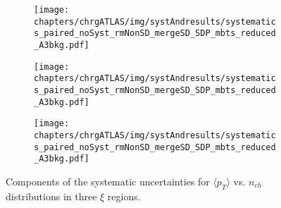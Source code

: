 \begin{figure}[h!]
	\centering
	\begin{subfigure}{.49\textwidth}
		\texttt{[image: chapters/chrgATLAS/img/systAndresults/systematics\_paired\_noSyst\_rmNonSD\_mergeSD\_SDP\_mbts\_reduced\_A3bkg.pdf]}
	\end{subfigure}
	\begin{subfigure}{.49\textwidth}
		\texttt{[image: chapters/chrgATLAS/img/systAndresults/systematics\_paired\_noSyst\_rmNonSD\_mergeSD\_SDP\_mbts\_reduced\_A3bkg.pdf]}
	\end{subfigure}
	\begin{subfigure}{.49\textwidth}
		\texttt{[image: chapters/chrgATLAS/img/systAndresults/systematics\_paired\_noSyst\_rmNonSD\_mergeSD\_SDP\_mbts\_reduced\_A3bkg.pdf]}
	\end{subfigure}
	\begin{minipage}{.49\textwidth}
		\caption{Components of the systematic uncertainties for $\langle p_T \rangle$ vs. $n_{ch}$ distributions in three $\xi$ regions. }
		\label{fig:results_atlas_meanpt_ssyst_sd}
	\end{minipage}
\end{figure}